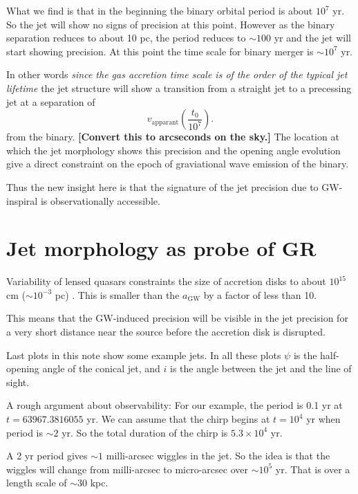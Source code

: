\documentclass[iop]{emulateapj}
\begin{document}
What we find is that in the beginning the binary orbital period is
about $10^7$ yr. So the jet will show no signs of precision at this
point.  However as the binary separation reduces to about 10 pc, the
period reduces to $\sim 100$ yr and the jet will start showing
precision.  At this point the time scale for binary merger is $\sim
10^7$ yr.

In other words \emph{since the gas accretion time scale is of the
  order of the typical jet lifetime} the jet structure will show a
transition from a straight jet to a precessing jet at a separation of
\begin{equation}
  v_\mathrm{apparant}\left(\frac{t_0}{10^7}\right).
\end{equation}
from the binary.  \textbf{[Convert this to arcseconds on the sky.]}
The location at which the jet morphology shows this precision and the
opening angle evolution give a direct constraint on the epoch of
graviational wave emission of the binary.

Thus the new insight here is that the signature of the jet precision
due to GW-inspiral is observationally accessible. 

\section{Jet morphology as probe of GR}

Variability of lensed quasars constraints the size of accretion disks
to about $10^{15}$ cm ($\sim 10^{-3}$ pc) \citep{2010ApJ...712.1129M}.
This is smaller than the $a_\mathrm{GW}$ by a factor of less than 10.

This means that the GW-induced precision will be visible in the jet
precision for a very short distance near the source before the
accretion disk is disrupted.

Last plots in this note show some example jets.  In all these plots
$\psi$ is the half-opening angle of the conical jet, and $i$ is the
angle between the jet and the line of sight.

A rough argument about observability: For our example, the period is
0.1 yr at $t = 63967.3816055$ yr.  We can assume that the chirp begins
at $t = 10^4$ yr when period is $\sim 2$ yr.  So the total duration of
the chirp is $5.3\times 10^4$ yr.

A 2 yr period gives $\sim 1$ milli-arcsec wiggles in the jet.  So the
idea is that the wiggles will change from milli-arcsec to micro-arcsec
over $\sim 10^5$ yr.  That is over a length scale of $\sim 30$ kpc.
\end{document}

